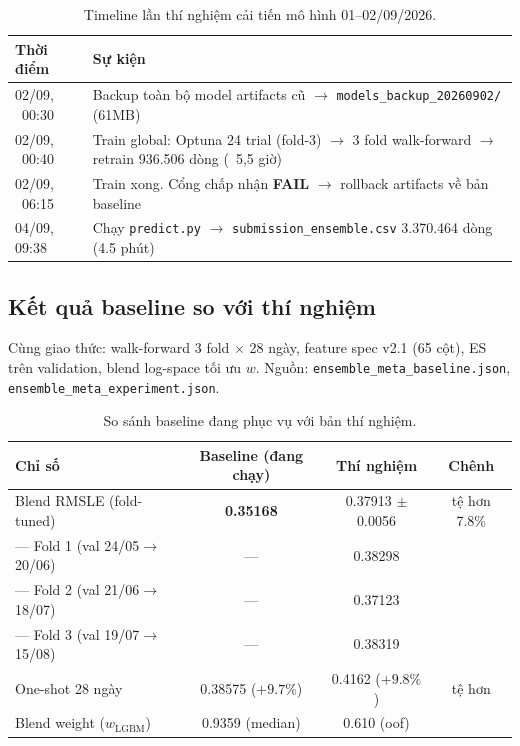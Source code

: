 \documentclass[12pt,a4paper]{report}
\begin{document}
\begin{table}[H]
\centering
\small
\begin{tabular}{@{}lp{11.5cm}@{}}
\toprule
\textbf{Thời điểm} & \textbf{Sự kiện} \\
\midrule
02/09, ~00:30 & Backup toàn bộ model artifacts cũ $\rightarrow$ \texttt{models\_backup\_20260902/} (61MB) \\
02/09, ~00:40 & Train global: Optuna 24 trial (fold-3) $\rightarrow$ 3 fold walk-forward $\rightarrow$ retrain 936.506 dòng (~5,5 giờ) \\
02/09, ~06:15 & Train xong. Cổng chấp nhận \textbf{FAIL} $\rightarrow$ rollback artifacts về bản baseline \\
04/09, 09:38 & Chạy \texttt{predict.py} $\rightarrow$ \texttt{submission\_ensemble.csv} 3.370.464 dòng (4.5 phút) \\
\bottomrule
\end{tabular}
\caption{Timeline lần thí nghiệm cải tiến mô hình 01--02/09/2026.}
\label{tab:timeline}
\end{table}

\subsection{Kết quả baseline so với thí nghiệm}

Cùng giao thức: walk-forward 3 fold $\times$ 28 ngày, feature spec v2.1 (65 cột), ES
trên validation, blend log-space tối ưu $w$. Nguồn:
\texttt{ensemble\_meta\_baseline.json}, \texttt{ensemble\_meta\_experiment.json}.

\begin{table}[H]
\centering
\small
\begin{tabular}{@{}lccc@{}}
\toprule
\textbf{Chỉ số} & \textbf{Baseline (đang chạy)} & \textbf{Thí nghiệm} & \textbf{Chênh} \\
\midrule
Blend RMSLE (fold-tuned) & \textbf{0.35168} & 0.37913 $\pm$ 0.0056 & tệ hơn 7.8\% \\
--- Fold 1 (val 24/05$\rightarrow$20/06) & --- & 0.38298 & \\
--- Fold 2 (val 21/06$\rightarrow$18/07) & --- & 0.37123 & \\
--- Fold 3 (val 19/07$\rightarrow$15/08) & --- & 0.38319 & \\
One-shot 28 ngày & 0.38575 ($+9.7\%$) & 0.4162 ($+9.8\%$) & tệ hơn \\
Blend weight ($w_{\mathrm{LGBM}}$) & 0.9359 (median) & 0.610 (oof) & \\
\bottomrule
\end{tabular}
\caption{So sánh baseline đang phục vụ với bản thí nghiệm.}
\label{tab:experiment}
\end{table}
\end{document}
